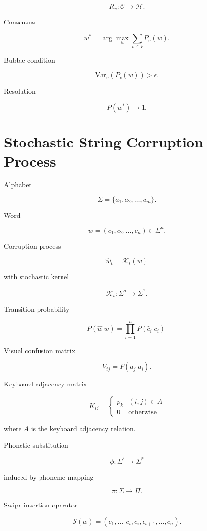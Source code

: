 \documentclass[11pt]{article}
\begin{document}
\[
R_v :
\mathcal{O}
\to
\mathcal{H}.
\]

Consensus

\[
w^* =
\arg\max_w
\sum_{v\in V}
P_v(w).
\]

Bubble condition

\[
\text{Var}_v(P_v(w)) > \epsilon.
\]

Resolution

\[
P(w^*) \to 1.
\]


\section{Stochastic String Corruption Process}

Alphabet

\[
\Sigma = \{a_1,a_2,\dots,a_m\}.
\]

Word

\[
w = (c_1,c_2,\dots,c_n) \in \Sigma^n.
\]

Corruption process

\[
\hat{w}_t = \mathcal{K}_t(w)
\]

with stochastic kernel

\[
\mathcal{K}_t : \Sigma^n \to \Sigma^*.
\]

Transition probability

\[
P(\hat{w}|w)
=
\prod_{i=1}^{n} P(\hat{c}_i | c_i).
\]

Visual confusion matrix

\[
V_{ij} = P(a_j|a_i).
\]

Keyboard adjacency matrix

\[
K_{ij} =
\begin{cases}
p_k & (i,j)\in A \\
0 & \text{otherwise}
\end{cases}
\]

where $A$ is the keyboard adjacency relation.

Phonetic substitution

\[
\phi : \Sigma^* \to \Sigma^*
\]

induced by phoneme mapping

\[
\pi : \Sigma \to \Pi.
\]

Swipe insertion operator

\[
\mathcal{S}(w)
=
(c_1,\dots,c_i,c_i,c_{i+1},\dots,c_n).
\]
\end{document}
